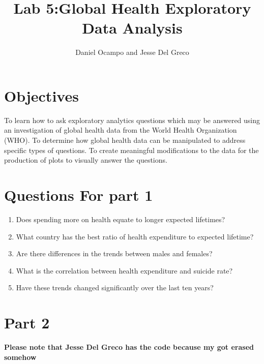 \documentclass[11pt]{article}
\begin{document}
%
\author{Daniel Ocampo and Jesse Del Greco}
\title{Lab 5:Global Health Exploratory Data Analysis}
\maketitle

\section{Objectives}

To learn how to ask exploratory analytics questions which may be answered using an investigation
of global health data from the World Health Organization (WHO). To determine how global health
data can be manipulated to address specific types of questions. To create meaningful modifications
to the data for the production of plots to visually answer the questions.


\section{Questions For part 1}
\begin{enumerate}
    \item Does spending
more on health equate to longer
expected lifetimes?

\item What country has the best ratio of health expenditure to
expected lifetime?
 \item Are there
differences in
the trends between males
and females?
\item What is the
correlation between health
expenditure and suicide rate?

\item Have these trends changed significantly over the last
ten years?



\end{enumerate}

\section{ Part 2}

\large{\textbf{Please note that Jesse Del Greco has the code because my got erased somehow}}
\end{document}
